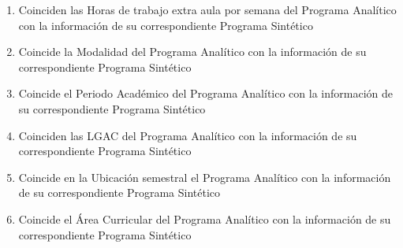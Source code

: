 \documentclass{article}
\begin{document}
\begin{Form}
\begin{enumerate}[leftmargin=*,itemsep=-2pt]
\item{Coinciden las Horas de trabajo extra aula por semana del
  Programa Anal\'{i}tico con la informaci\'{o}n de su correspondiente
  Programa Sint\'{e}tico   \hfill {}
  \quad
  }

\item{Coincide la Modalidad del Programa Anal\'{i}tico con la
  informaci\'{o}n de su correspondiente Programa Sint\'{e}tico
  \begin{flushright}
    \quad {}\end{flushright}}

\item{Coincide el Periodo Acad\'{e}mico del Programa Anal\'{i}tico con
  la informaci\'{o}n de su correspondiente Programa Sint\'{e}tico
  \begin{flushright}
  \quad
\end{flushright}
}

\item{Coinciden las LGAC del Programa Anal\'{i}tico con la
  informaci\'{o}n de su correspondiente Programa Sint\'{e}tico
  \begin{flushright}
  \quad%
  \end{flushright}}

\item{Coincide en la Ubicaci\'{o}n semestral el Programa Anal\'{i}tico
  con la informaci\'{o}n de su correspondiente Programa Sint\'{e}tico
  \begin{flushright}
  \quad
\end{flushright}
}

\item{Coincide el \'{A}rea Curricular del Programa Anal\'{i}tico con
  la informaci\'{o}n de su correspondiente Programa Sint\'{e}tico
  \begin{flushright}
  \quad
\end{flushright}
}


\end{enumerate}
\end{Form}
\end{document}
